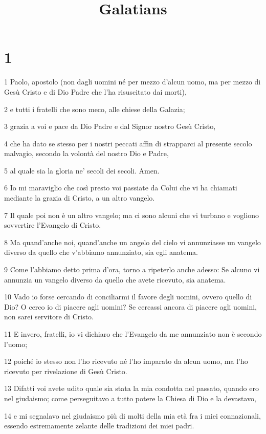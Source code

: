

\title{Galatians}


\chapter{1}

\par 1 Paolo, apostolo (non dagli uomini né per mezzo d'alcun uomo, ma per mezzo di Gesù Cristo e di Dio Padre che l'ha risuscitato dai morti),
\par 2 e tutti i fratelli che sono meco, alle chiese della Galazia;
\par 3 grazia a voi e pace da Dio Padre e dal Signor nostro Gesù Cristo,
\par 4 che ha dato se stesso per i nostri peccati affin di strapparci al presente secolo malvagio, secondo la volontà del nostro Dio e Padre,
\par 5 al quale sia la gloria ne' secoli dei secoli. Amen.
\par 6 Io mi maraviglio che così presto voi passiate da Colui che vi ha chiamati mediante la grazia di Cristo, a un altro vangelo.
\par 7 Il quale poi non è un altro vangelo; ma ci sono alcuni che vi turbano e vogliono sovvertire l'Evangelo di Cristo.
\par 8 Ma quand'anche noi, quand'anche un angelo del cielo vi annunziasse un vangelo diverso da quello che v'abbiamo annunziato, sia egli anatema.
\par 9 Come l'abbiamo detto prima d'ora, torno a ripeterlo anche adesso: Se alcuno vi annunzia un vangelo diverso da quello che avete ricevuto, sia anatema.
\par 10 Vado io forse cercando di conciliarmi il favore degli uomini, ovvero quello di Dio? O cerco io di piacere agli uomini? Se cercassi ancora di piacere agli uomini, non sarei servitore di Cristo.
\par 11 E invero, fratelli, io vi dichiaro che l'Evangelo da me annunziato non è secondo l'uomo;
\par 12 poiché io stesso non l'ho ricevuto né l'ho imparato da alcun uomo, ma l'ho ricevuto per rivelazione di Gesù Cristo.
\par 13 Difatti voi avete udito quale sia stata la mia condotta nel passato, quando ero nel giudaismo; come perseguitavo a tutto potere la Chiesa di Dio e la devastavo,
\par 14 e mi segnalavo nel giudaismo più di molti della mia età fra i miei connazionali, essendo estremamente zelante delle tradizioni dei miei padri.
